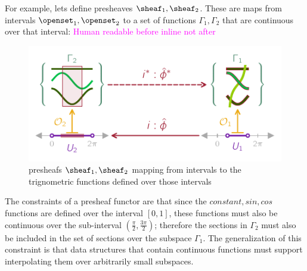 \documentclass[journal]{IEEEtran}
\newcommand{\note}[1]{\textcolor{magenta}{#1}}
\theoremstyle{definition}
\theoremstyle{remark}
\begin{document}
For example, lets define presheaves $\sheaf_1, \sheaf_2$. These are maps from intervals $\openset_1, \openset_2$ to a set of functions $\Gamma_1, \Gamma_2$ that are continuous over that interval:
\note{Human readable before inline not after}

\begin{figure}[H]
  \includegraphics*[width=1\columnwidth]{figures/tex/presheaf.pdf}
  \caption*{presheafs $\sheaf_1, \sheaf_2$ mapping from intervals to the trignometric functions defined over those intervals }
\end{figure}

The constraints of a presheaf functor are that since the $constant, sin, cos$ functions are defined over the interval $\left[0,1\right]$, these functions must also be continuous over the sub-interval $\left(\frac{\pi}{2}, \frac{3\pi}{2}\right)$; therefore the sections in $\Gamma_{2}$ must also be included in the set of sections over the subspace $\Gamma_{1}$. The generalization of this constraint is that data structures that contain continuous functions must support interpolating them over arbitrarily small subspaces.
\end{document}
